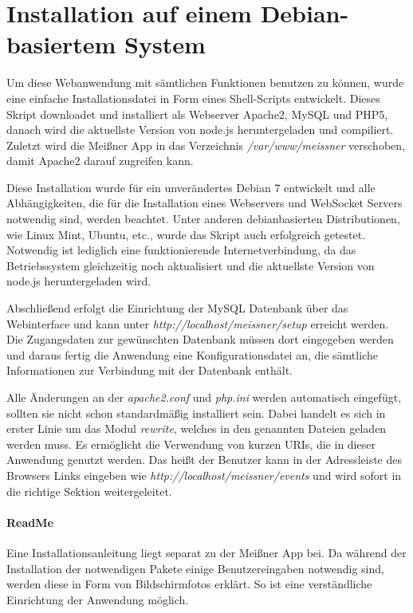 
\section{Installation auf einem Debian-basiertem System}
Um diese Webanwendung mit sämtlichen Funktionen benutzen zu können, wurde eine einfache Installationsdatei in Form eines Shell-Scripts entwickelt. Dieses Skript downloadet und installiert als Webserver Apache2, MySQL und PHP5, danach wird die aktuellste Version von node.js heruntergeladen und compiliert. Zuletzt wird die Meißner App in das Verzeichnis \emph{/var/www/meissner} verschoben, damit Apache2 darauf zugreifen kann.\par

Diese Installation wurde für ein unverändertes Debian 7 entwickelt und alle Abhängigkeiten, die für die Installation eines Webservers und WebSocket Servers notwendig sind, werden beachtet. Unter anderen debianbasierten Distributionen, wie Linux Mint, Ubuntu, etc., wurde das Skript auch erfolgreich getestet. Notwendig ist lediglich eine funktionierende Internetverbindung, da das Betriebssystem gleichzeitig noch aktualisiert und die aktuellste Version von node.js heruntergeladen wird.\par

Abschließend erfolgt die Einrichtung der MySQL Datenbank über das Webinterface und kann unter \emph{http://localhost/meissner/setup} erreicht werden. Die Zugangsdaten zur gewünschten Datenbank müssen dort eingegeben werden und daraus fertig die Anwendung eine Konfigurationsdatei an, die sämtliche Informationen zur Verbindung mit der Datenbank enthält.\par

Alle Änderungen an der \emph{apache2.conf} und \emph{php.ini} werden automatisch eingefügt, sollten sie nicht schon standardmäßig installiert sein. Dabei handelt es sich in erster Linie um das Modul \emph{rewrite}, welches in den genannten Dateien geladen werden muss. Es ermöglicht die Verwendung von kurzen URIs, die in dieser Anwendung genutzt werden. Das heißt der Benutzer kann in der Adressleiste des Browsers Links eingeben wie \emph{http://localhost/meissner/events} und wird sofort in die richtige Sektion weitergeleitet.

\paragraph{ReadMe}
Eine Installationsanleitung liegt separat zu der Meißner App bei. Da während der Installation der notwendigen Pakete einige Benutzereingaben notwendig sind, werden diese in Form von Bildschirmfotos erklärt. So ist eine verständliche Einrichtung der Anwendung möglich.

